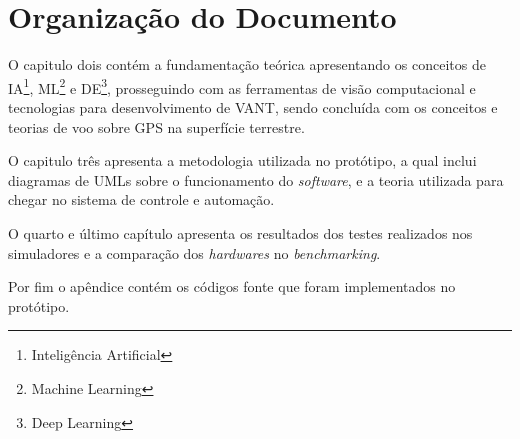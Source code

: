 \section{Organização do Documento}

O capitulo dois contém a fundamentação teórica apresentando os conceitos de IA\footnote{Inteligência Artificial}, ML\footnote{Machine Learning} e DE\footnote{Deep Learning}, prosseguindo com as ferramentas de visão computacional e tecnologias para desenvolvimento de VANT, sendo concluída com os conceitos e teorias de voo sobre GPS na superfície terrestre. 

O capitulo três apresenta a metodologia utilizada no protótipo, a qual inclui diagramas de UMLs sobre o funcionamento do \textit{software}, e a teoria utilizada para chegar no sistema de controle e automação.

O quarto e último capítulo apresenta os resultados dos testes realizados nos simuladores e a comparação dos \textit{hardwares} no \textit{benchmarking}.

Por fim o apêndice contém os códigos fonte que foram implementados no protótipo.


